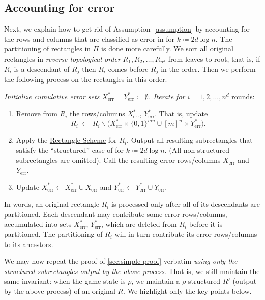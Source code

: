 \documentclass{toc}
\newcommand{\rectlemma}{\expref{Lemma}{lem:scheme}\xspace}%
\newcommand{\rectscheme}{\hyperref[alg:partition]{Rectangle Scheme}\xspace}
\DeclareMathOperator{\err}{err}
\newcommand{\allX}{[m]^n}
\newcommand{\allY}{\{0,1\}^{mn}}
\begin{document}
\subsection{Accounting for error} \label{sec:error}

Next, we explain how to get rid of
%
Assumption~\ref{assumption}  %
by accounting for the rows and columns that are classified as error in \rectlemma for $k\coloneqq 2d\log n$. The partitioning of
rectangles in $\Pi$ %
is done more
carefully.  %
We sort all original rectangles in \emph{reverse topological order} $R_1,R_2,\ldots,R_{n^d}$ from leaves to root, that is, if $R_i$ is a descendant of $R_j$ then $R_i$ comes before $R_j$ in the order. Then we
perform the following %
process
on %
the rectangles
in this order. %

\medskip\noindent
{\slshape Initialize cumulative error sets $X^*_{\err}=Y^*_{\err}\coloneqq\emptyset$. Iterate for $i=1,2,\ldots,n^d$} rounds:
\begin{enumerate}[topsep=1mm,itemsep=2mm]
\item Remove from $R_i$ the rows/columns $X^*_{\err}$, $Y^*_{\err}$. That is, update
\[
R_i~\leftarrow~
R_i \smallsetminus \big(X^*_{\err}\times \allY \cup \allX\times Y^*_{\err}\big).
\]
\item Apply the \rectscheme for $R_i$. Output all resulting subrectangles that satisfy the ``structured'' case of \rectlemma for $k\coloneqq 2d\log n$. (All non-structured subrectangles are omitted). Call the resulting error rows/columns $X_{\err}$ and $Y_{\err}$.
\item Update $X^*_{\err}\leftarrow X^*_{\err} \cup X_{\err}$ and $Y^*_{\err}\leftarrow Y^*_{\err}\cup Y_{\err}$.
\end{enumerate}

\medskip\noindent
In words, an original rectangle $R_i$ is processed only after all of its descendants are partitioned. Each descendant may contribute some error rows/columns, accumulated into sets $X^*_{\err}$, $Y^*_{\err}$, which are deleted from $R_i$ before it is partitioned. The partitioning of $R_i$ will in turn contribute its error rows/columns to its ancestors.

We may now repeat the proof of \autoref{sec:simple-proof} verbatim \emph{using only the structured subrectangles output by the above process}. That is, we still maintain the same invariant: when the game state is $\rho$, we maintain a $\rho$-structured $R'$ (output by the above process) of an original $R$. We highlight only the key points below.
\end{document}
